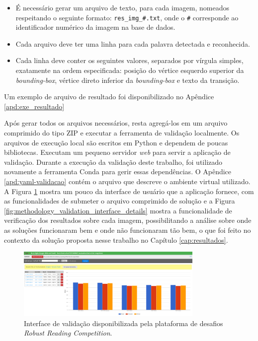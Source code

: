 \begin{itemize}
    \item É necessário gerar um arquivo de texto, para cada imagem, nomeados respeitando o seguinte formato: \texttt{res\_img\_\#.txt}, onde o \texttt{\#} 
    corresponde ao identificador numérico da imagem na base de dados.

    \item Cada arquivo deve ter uma linha para cada palavra detectada e reconhecida.

    \item Cada linha deve conter os seguintes valores, separados por vírgula simples, exatamente na ordem especificada: posição do vértice esquerdo 
    superior da \textit{bounding-box}, vértice direto inferior da \textit{bounding-box} e texto da transição.
\end{itemize}

Um exemplo de arquivo de resultado foi disponibilizado no Apêndice \ref{apd:exe_resultado}

Após gerar todos os arquivos necessários, resta agregá-los em um arquivo comprimido do tipo ZIP e executar a ferramenta de validação localmente. 
Os arquivos de execução local são escritos em Python e dependem de poucas bibliotecas. Executam um pequeno servidor \textit{web} para servir a aplicação 
de validação. Durante a execução da validação deste trabalho, foi utilizado novamente a ferramenta Conda para gerir essas dependências. O Apêndice 
\ref{apd:yaml-validacao} contém o arquivo que descreve o ambiente virtual utilizado. A Figura \ref{fig:methodology_validation_interface} mostra um 
pouco da interface de usuário que a aplicação fornece, com as funcionalidades de submeter o arquivo comprimido de solução e a Figura 
\ref{fig:methodology_validation_interface_details} mostra a funcionalidade de verificação dos resultados sobre cada imagem, possibilitando a 
análise sobre onde as soluções funcionaram bem e onde não funcionaram tão bem, o que foi feito no contexto da solução proposta nesse trabalho 
no Capítulo \ref{cap:resultados}.

\begin{figure}
    \centering
    \includegraphics[width=0.8\textwidth]{figs/metodologia-interface-validacao.png}
    \caption{Interface de validação disponibilizada pela plataforma de desafios \textit{Robust Reading Competition}.}
    \label{fig:methodology_validation_interface}
\end{figure}

